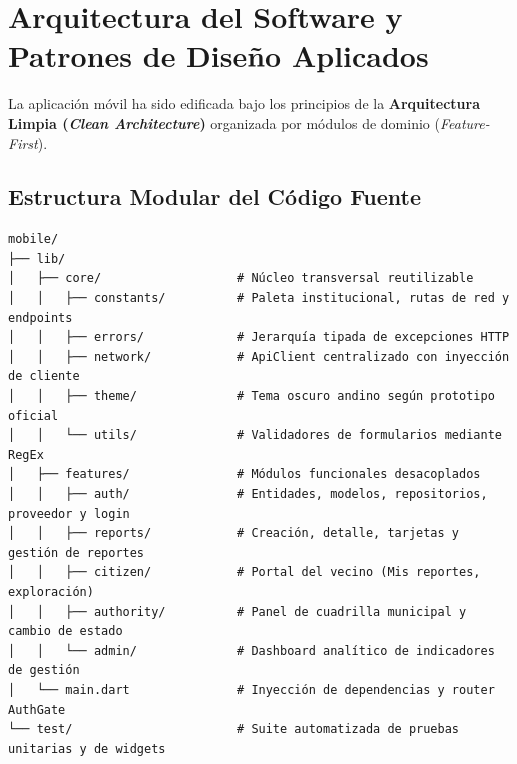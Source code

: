 \documentclass[12pt,a4paper]{article}
\begin{document}
\section{Arquitectura del Software y Patrones de Diseño Aplicados}

La aplicación móvil ha sido edificada bajo los principios de la \textbf{Arquitectura Limpia (\textit{Clean Architecture})} organizada por módulos de dominio (\textit{Feature-First}).

\subsection{Estructura Modular del Código Fuente}
\begin{verbatim}
mobile/
├── lib/
│   ├── core/                   # Núcleo transversal reutilizable
│   │   ├── constants/          # Paleta institucional, rutas de red y endpoints
│   │   ├── errors/             # Jerarquía tipada de excepciones HTTP
│   │   ├── network/            # ApiClient centralizado con inyección de cliente
│   │   ├── theme/              # Tema oscuro andino según prototipo oficial
│   │   └── utils/              # Validadores de formularios mediante RegEx
│   ├── features/               # Módulos funcionales desacoplados
│   │   ├── auth/               # Entidades, modelos, repositorios, proveedor y login
│   │   ├── reports/            # Creación, detalle, tarjetas y gestión de reportes
│   │   ├── citizen/            # Portal del vecino (Mis reportes, exploración)
│   │   ├── authority/          # Panel de cuadrilla municipal y cambio de estado
│   │   └── admin/              # Dashboard analítico de indicadores de gestión
│   └── main.dart               # Inyección de dependencias y router AuthGate
└── test/                       # Suite automatizada de pruebas unitarias y de widgets
\end{verbatim}
\end{document}
